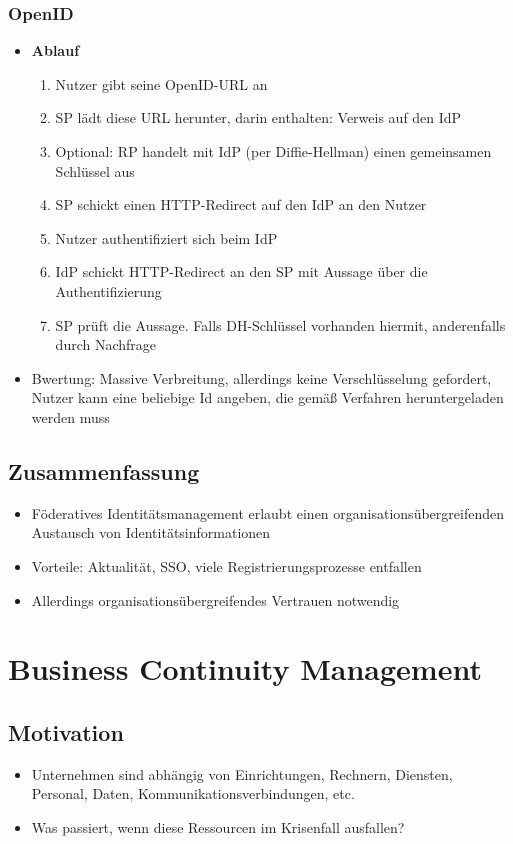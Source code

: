 \subsubsection{OpenID}
\begin{itemize}
	\item \textbf{Ablauf}
	\begin{enumerate}
		\item Nutzer gibt seine OpenID-URL an
		\item SP lädt diese URL herunter, darin enthalten: Verweis auf den IdP
		\item Optional: RP handelt mit IdP (per Diffie-Hellman) einen gemeinsamen Schlüssel aus
		\item SP schickt einen HTTP-Redirect auf den IdP an den Nutzer
		\item Nutzer authentifiziert sich beim IdP
		\item IdP schickt HTTP-Redirect an den SP mit Aussage über die Authentifizierung
		\item SP prüft die Aussage. Falls DH-Schlüssel vorhanden hiermit, anderenfalls durch Nachfrage
	\end{enumerate}
	\item Bwertung: Massive Verbreitung, allerdings keine Verschlüsselung gefordert, Nutzer kann eine beliebige Id angeben, die gemäß Verfahren heruntergeladen werden muss
\end{itemize}


\subsection{Zusammenfassung}
\begin{itemize}
	\item Föderatives Identitätsmanagement erlaubt einen organisationsübergreifenden Austausch von Identitätsinformationen
	\item Vorteile: Aktualität, SSO, viele Registrierungsprozesse entfallen
	\item Allerdings organisationsübergreifendes Vertrauen notwendig
\end{itemize}



\section{Business Continuity Management}

\subsection{Motivation}
\begin{itemize}
	\item Unternehmen sind abhängig von Einrichtungen, Rechnern, Diensten, Personal, Daten, Kommunikationsverbindungen, etc.
	\item Was passiert, wenn diese Ressourcen im Krisenfall ausfallen?
\end{itemize}


